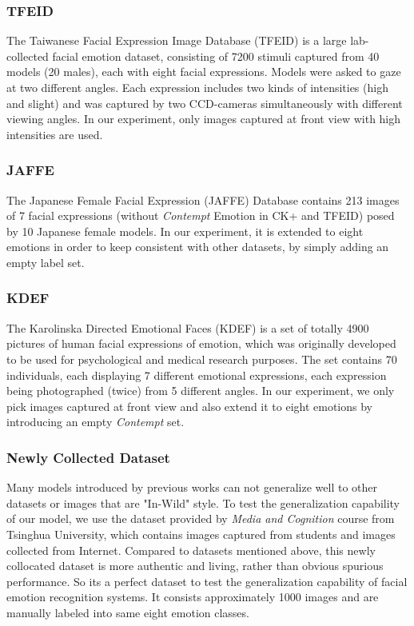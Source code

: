 \documentclass[conference]{IEEEtran}
\begin{document}
\subsubsection{TFEID}
The Taiwanese Facial Expression Image Database (TFEID) \cite{Chen2007TFEID} is a large lab-collected facial emotion dataset, consisting of 7200 stimuli captured from 40 models (20 males), each with eight facial expressions. Models were asked to gaze at two different angles. Each expression includes two kinds of intensities (high and slight) and was captured by two CCD-cameras simultaneously with different viewing angles. In our experiment, only images captured at front view with high intensities are used.

\subsubsection{JAFFE}
The Japanese Female Facial Expression (JAFFE) Database \cite{Lyons2002Automatic} contains 213 images of 7 facial expressions (without \emph{Contempt} Emotion in CK+ and TFEID) posed by 10 Japanese female models. In our experiment, it is extended to eight emotions in order to keep consistent with other datasets, by simply adding an empty label set.

\subsubsection{KDEF}
The Karolinska Directed Emotional Faces (KDEF) \cite{Lundqvist1998The} is a set of totally 4900 pictures of human facial expressions of emotion, which was originally developed to be used for psychological and medical research purposes. The set contains 70 individuals, each displaying 7 different emotional expressions, each expression being photographed (twice) from 5 different angles. In our experiment, we only pick images captured at front view and also extend it to eight emotions by introducing an empty \emph{Contempt} set.

\subsubsection{Newly Collected Dataset}
Many models introduced by previous works can not generalize well to other datasets or images that are "In-Wild" style. To test the generalization capability of our model, we use the dataset provided by \emph{Media and Cognition} course from Tsinghua University, which contains images captured from students and images collected from Internet. Compared to datasets mentioned above, this newly collocated dataset is more authentic and living, rather than obvious spurious performance. So its a perfect dataset to test the generalization capability of facial emotion recognition systems. It consists approximately 1000 images and are manually labeled into same eight emotion classes.
\end{document}
